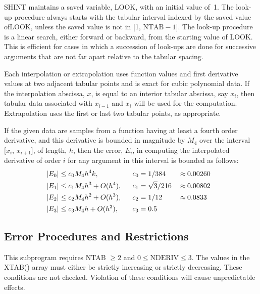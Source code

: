 \documentclass[twoside]{MATH77}
\begin{document}
SHINT maintains a saved variable, LOOK, with an initial value of~1. The
look-up procedure always starts with the tabular interval indexed by the
saved value of\pagebreak[2] LOOK, unless the saved value is not in
{[1, $\text{NTAB} - 1$]}.
The look-up procedure is a linear search, either forward or backward, from the
starting value of LOOK. This is efficient for cases in which a succession of
look-ups are done for successive arguments that are not far apart relative
to the tabular spacing.

Each interpolation or extrapolation uses function values and first
derivative values at two adjacent tabular points and is exact for
cubic polynomial data.  If the interpolation abscissa, $x$, is equal
to an interior tabular abscissa, say $x_i$, then tabular data
associated with $x_{i-1}$ and $x_i$ will be used for the computation.
Extrapolation uses the first or last two tabular points, as
appropriate.

If the given data are samples from a function having at least a fourth order
derivative, and this derivative is bounded in magnitude by $M_4$ over the
interval $[x_i$, $x_{i+1}]$, of length, $h$, then the error, $E_i$, in
computing the interpolated derivative of order $i$ for any argument in this
interval is bounded as follows:
\begin{alignat*}{3}
\hspace{-8pt}
|E_0| &\leq c_0M_4h^4k,&\ \ c_0 &= 1/384\:&\approx \:&0.00260\\
\hspace{-8pt}
|E_1| &\leq c_1M_4h^3 + O(h^4),&\ \ c_1 &= \sqrt 3/216\:
&\approx \:&0.00802\\
\hspace{-8pt}
|E_2| &\leq c_2M_4h^2 + O(h^3),&\ \ c_2&= 1/12 \:&\approx \:&0.0833\\
\hspace{-8pt}
|E_3| &\leq c_3M_4h + O(h^2),&\ \ c_3 & = 0.5
\end{alignat*}




\subsection{Error Procedures and Restrictions}

This subprogram requires NTAB $\geq 2$ and $0 \leq \text{NDERIV} \leq 3$.
The values in the XTAB() array must either be strictly increasing or
strictly decreasing. These conditions are not checked. Violation of these
conditions will cause unpredictable effects.
\end{document}
